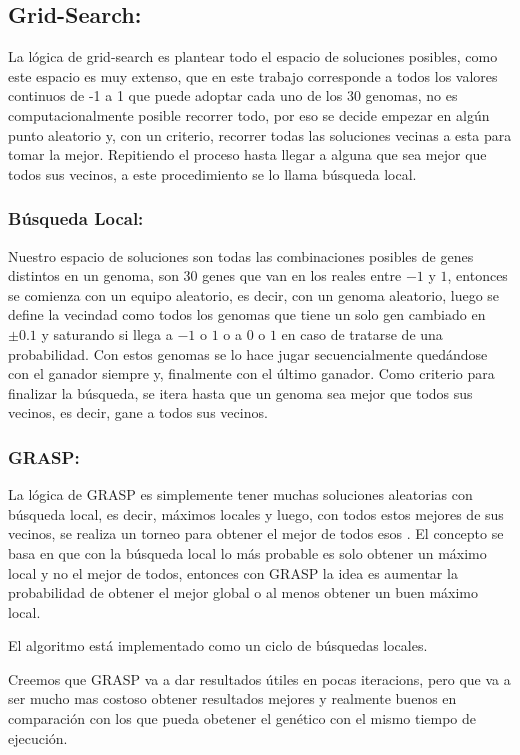 \subsection{Grid-Search:}

La lógica de grid-search es plantear todo el espacio de soluciones posibles,
como este espacio es muy extenso, que en este trabajo corresponde a todos los
valores continuos de -1 a 1 que puede adoptar cada uno de los 30 genomas, no es
computacionalmente posible recorrer todo, por eso se decide empezar en algún
punto aleatorio y, con un criterio, recorrer todas las soluciones vecinas a esta
para tomar la mejor. Repitiendo el proceso hasta llegar a alguna que sea mejor que
todos sus vecinos, a este procedimiento se lo llama búsqueda local.


\subsubsection{Búsqueda Local:}


Nuestro espacio de soluciones son todas las combinaciones posibles de genes
distintos en un genoma, son 30 genes que van en los reales entre $-1$ y $1$,
entonces se comienza con un equipo aleatorio, es decir, con un genoma aleatorio,
luego se define la vecindad como todos los genomas que tiene un solo gen
cambiado en $\pm 0.1$ y saturando si llega a $-1$ o $1$ o a $0$ o $1$ en caso de
tratarse de una probabilidad. Con estos genomas se lo hace jugar secuencialmente
quedándose con el ganador siempre y, finalmente con el último ganador. Como
criterio para finalizar la búsqueda, se itera hasta que un genoma sea
mejor que todos sus vecinos, es decir, gane a todos sus vecinos.


\subsubsection{GRASP:}


La lógica de GRASP es simplemente tener muchas soluciones aleatorias con
búsqueda local, es decir, máximos locales y luego, con todos estos mejores de
sus vecinos, se realiza un torneo para obtener el mejor de todos esos . El
concepto se basa en que con la búsqueda local lo más probable es solo obtener un
máximo local y no el mejor de todos, entonces con GRASP la idea es aumentar la
probabilidad de obtener el mejor global o al menos obtener un buen máximo local.

El algoritmo está implementado como un ciclo de búsquedas locales.

Creemos que GRASP va a dar resultados útiles en pocas iteracions, pero que va a
ser mucho mas costoso obtener resultados mejores y realmente buenos en
comparación con los que pueda obetener el genético con el mismo tiempo de
ejecución.
